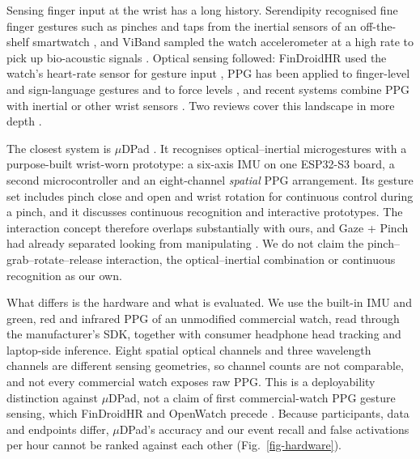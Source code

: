 
\label{related-work-and-evaluation-context}

\label{wrist-based-finger-recognition}

Sensing finger input at the wrist has a long history. Serendipity recognised fine finger gestures such as pinches and taps from the inertial sensors of an off-the-shelf smartwatch \cite{serendipity}, and ViBand sampled the watch accelerometer at a high rate to pick up bio-acoustic signals \cite{viband}. Optical sensing followed: FinDroidHR used the watch's heart-rate sensor for gesture input \cite{findroidhr}, PPG has been applied to finger-level and sign-language gestures \cite{zhao2018ppg,zhao2021sign} and to force levels \cite{buddhika2019fsense,li2023force}, and recent systems combine PPG with inertial or other wrist sensors \cite{wang2022wristband,eddy2024multimodal,hauptmann2026mudpad}. Two reviews cover this landscape in more depth \cite{tchantchane2023review,charlton2023roadmap}.

\iffull
The closest system is $\mu$DPad \cite{hauptmann2026mudpad}. It recognises optical--inertial microgestures with a purpose-built wrist-worn prototype: a six-axis IMU on one ESP32-S3 board, a second microcontroller and an eight-channel \emph{spatial} PPG arrangement. Its gesture set includes pinch close and open and wrist rotation for continuous control during a pinch, and it discusses continuous recognition and interactive prototypes. The interaction concept therefore overlaps substantially with ours, and Gaze + Pinch had already separated looking from manipulating \cite{pfeuffer2017gazepinch}. We do not claim the pinch--grab--rotate--release interaction, the optical--inertial combination or continuous recognition as our own.

What differs is the hardware and what is evaluated. We use the built-in IMU and green, red and infrared PPG of an unmodified commercial watch, read through the manufacturer's SDK, together with consumer headphone head tracking and laptop-side inference. Eight spatial optical channels and three wavelength channels are different sensing geometries, so channel counts are not comparable, and not every commercial watch exposes raw PPG. This is a deployability distinction against $\mu$DPad, not a claim of first commercial-watch PPG gesture sensing, which FinDroidHR and OpenWatch precede \cite{findroidhr,openwatch}. Because participants, data and endpoints differ, $\mu$DPad's accuracy and our event recall and false activations per hour cannot be ranked against each other (Fig.~\ref{fig-hardware}).


